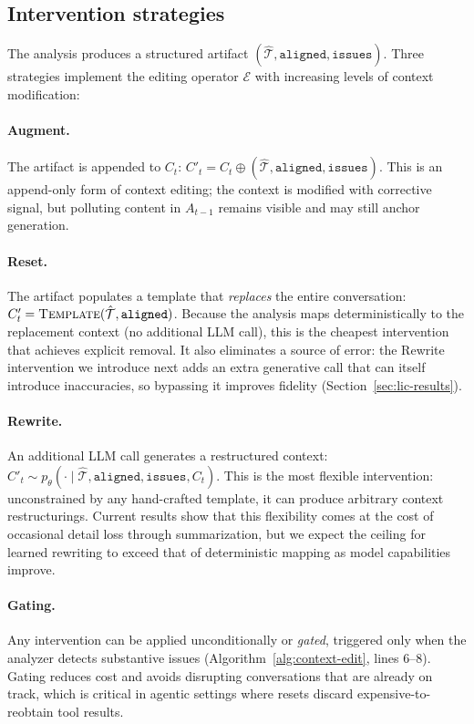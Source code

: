 \documentclass{article}
\begin{document}
\subsection{Intervention strategies}
\label{sec:strategies}

The analysis produces a structured artifact $(\hat{\mathcal{T}}, \texttt{aligned}, \texttt{issues})$. Three strategies implement the editing operator $\mathcal{E}$ with increasing levels of context modification:

\paragraph{Augment.} The artifact is appended to $C_t$: $C'_t = C_t \oplus (\hat{\mathcal{T}}, \texttt{aligned}, \texttt{issues})$. This is an append-only form of context editing; the context is modified with corrective signal, but polluting content in $A_{t-1}$ remains visible and may still anchor generation.

\paragraph{Reset.} The artifact populates a template that \emph{replaces} the entire conversation: $C'_t = \textsc{Template}(\hat{\mathcal{T}}, \texttt{aligned})$. Because the analysis maps deterministically to the replacement context (no additional LLM call), this is the cheapest intervention that achieves explicit removal. It also eliminates a source of error: the Rewrite intervention we introduce next adds an extra generative call that can itself introduce inaccuracies, so bypassing it improves fidelity (Section~\ref{sec:lic-results}).

\paragraph{Rewrite.} An additional LLM call generates a restructured context: $C'_t \sim p_\theta(\cdot \mid \hat{\mathcal{T}}, \texttt{aligned}, \texttt{issues}, C_t)$. This is the most flexible intervention: unconstrained by any hand-crafted template, it can produce arbitrary context restructurings. Current results show that this flexibility comes at the cost of occasional detail loss through summarization, but we expect the ceiling for learned rewriting to exceed that of deterministic mapping as model capabilities improve.

\paragraph{Gating.} Any intervention can be applied unconditionally or \emph{gated}, triggered only when the analyzer detects substantive issues (Algorithm~\ref{alg:context-edit}, lines 6--8). Gating reduces cost and avoids disrupting conversations that are already on track, which is critical in agentic settings where resets discard expensive-to-reobtain tool results.
\end{document}
